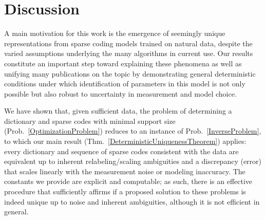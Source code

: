 \documentclass[journal, twocolumn]{IEEEtran}
\begin{document}


\section{Discussion}\label{Discussion}

A main motivation for this work is the emergence of seemingly unique representations from sparse coding models trained on natural data, despite the varied assumptions underlying the many algorithms in current use. Our results constitute an important step toward explaining these phenomena as well as unifying many publications on the topic by demonstrating general deterministic conditions under which identification of parameters in this model is not only possible but also robust to uncertainty in measurement and model choice.

We have shown that, given sufficient data, the problem of determining a dictionary and sparse codes with minimal support size (Prob.~\ref{OptimizationProblem}) reduces to an instance of Prob.~\ref{InverseProblem}, to which our main result (Thm.~\ref{DeterministicUniquenessTheorem}) applies: every dictionary and sequence of sparse codes consistent with the data are equivalent up to inherent relabeling/scaling ambiguities and a discrepancy (error) that scales linearly with the measurement noise or modeling inaccuracy. The constants we provide are explicit and computable; as such, there is an effective procedure that sufficiently affirms if a proposed solution to these problems is indeed unique up to noise and inherent ambiguities, although it is not efficient in general.
\end{document}
